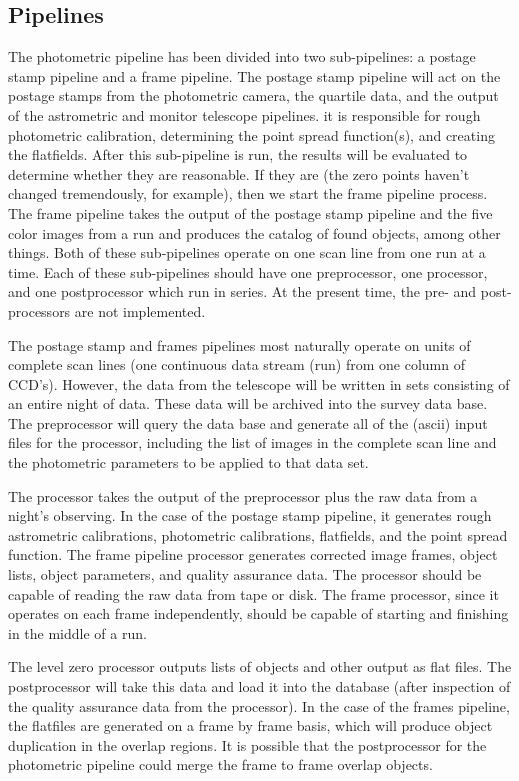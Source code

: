 \subsection{Pipelines}

	The photometric pipeline has been divided into two sub-pipelines:
a postage stamp pipeline and a frame pipeline.  The postage stamp pipeline
will act on the postage stamps from the photometric camera, the quartile
data, and the output of the astrometric and monitor telescope pipelines.
it is responsible for rough photometric calibration,
determining the point spread function(s), and creating the flatfields.
After this sub-pipeline is run, the results will be evaluated to determine
whether they are reasonable.  If they are (the zero points haven't changed
tremendously, for example), then we start the frame pipeline process.
The frame pipeline takes the output of the postage stamp pipeline and the
five color images from a run and produces the catalog of found objects,
among other things.  Both of these sub-pipelines operate on one scan line
from one run at a time.  Each of these sub-pipelines should have one 
preprocessor, one processor, and one postprocessor which run in series.
At the present time, the pre- and post- processors are not implemented.

	The postage stamp and frames pipelines most naturally operate 
on units of complete scan lines (one continuous data stream (run) from one 
column of CCD's).  However, the data from the telescope will be written
in sets consisting of an entire night of data.  These data will be
archived into the survey data base.  The preprocessor
will query the data base and generate all of the (ascii) input files
for the processor, including the list of images in the complete
scan line and the photometric parameters to be applied to that
data set.

	The processor takes the output of the preprocessor plus the
raw data from a night's observing.  In the case of the postage stamp
pipeline, it generates rough astrometric calibrations, photometric
calibrations, flatfields, and the point spread function.  The frame
pipeline processor generates corrected image frames,
object lists, object parameters, and quality assurance data.  The processor 
should be capable of reading the raw data from tape or disk.  The frame
processor, since it operates on each frame independently, should be 
capable of starting and finishing in the middle of a run.

	The level zero processor outputs lists of objects and other output
as flat files.  The postprocessor will take this data and load it into the
database (after inspection of the quality assurance data from the processor).
In the case of the frames pipeline, the flatfiles are
generated on a frame by frame basis, which will produce object
duplication in the overlap regions.  It is possible that the postprocessor
for the photometric pipeline could merge the frame to frame overlap objects.


